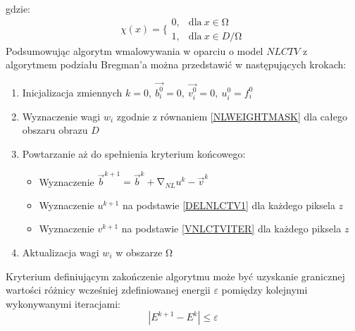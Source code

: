 \documentclass[12pt, twoside, openany]{report}
\theoremstyle{definition}
\begin{document}
gdzie:
\begin{equation}
{\chi }\left(x\right)=\Bigg\{ \begin{array}{ll}
0, & \text{dla} \ x \in  \mathrm{\Omega} \\ 
1, & \text{dla} \ x \in  D/\mathrm{\Omega} \end{array}
\end{equation}
Podsumowując algorytm wmalowywania w oparciu o model $NLCTV$ z algorytmem podziału Bregman’a można przedstawić w następujących krokach:
\begin{enumerate}
\item  
Inicjalizacja zmiennych $k=0,\ \overrightarrow{b^0_i}=0,\ \overrightarrow{v^0_i}=0,\ u^0_i=f^0_i$ 
\item  
Wyznaczenie wagi $w_i$ zgodnie z równaniem \eqref{NLWEIGHTMASK} dla całego obszaru obrazu $D$
\item  
Powtarzanie aż do spełnienia kryterium końcowego:
\begin{itemize}
\item
\noindent Wyznaczenie ${\overrightarrow{b}}^{k+1}={\overrightarrow{b}}^k+{\mathrm{\nabla }}_{NL}u^k-{\overrightarrow{v}}^k$
\item
\noindent Wyznaczenie $u^{k+1}$ na podstawie \eqref{DELNLCTV1} dla każdego piksela $z$
\item
\noindent Wyznaczenie $v^{k+1}$ na podstawie \eqref{VNLCTVITER} dla każdego piksela $z$
\end{itemize}
\item  
Aktualizacja wagi $w_i$ w obszarze $\mathrm{\Omega }$
\end{enumerate}
Kryterium definiującym zakończenie algorytmu może być uzyskanie granicznej wartości różnicy wcześniej zdefiniowanej energii $\varepsilon$ pomiędzy kolejnymi wykonywanymi iteracjami:
\begin{equation}
\left|E^{k+1}-E^k\right|\le \varepsilon
\end{equation}
\end{document}
